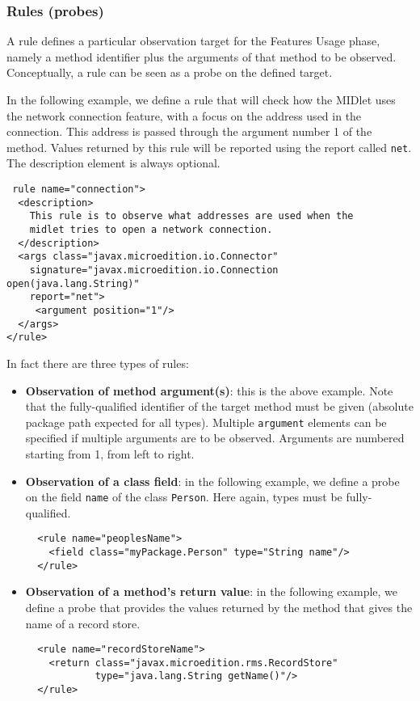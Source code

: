 \subsubsection{Rules (probes)}
A rule defines a particular observation target for the Features Usage
phase, namely a method identifier plus the arguments of that method to
be observed. Conceptually, a rule can be seen as a probe on the
defined target.

In the following example, we define a rule that will check how the
MIDlet uses the network connection feature, with a focus on the
address used in the connection. This address is passed through the
argument number 1 of the method. Values returned by this rule will be
reported using the report called \texttt{net}. The description element
is always optional.
\begin{verbatim}
 rule name="connection">
  <description>
    This rule is to observe what addresses are used when the
    midlet tries to open a network connection.
  </description>
  <args class="javax.microedition.io.Connector"
    signature="javax.microedition.io.Connection open(java.lang.String)"
    report="net">
     <argument position="1"/>
  </args>
</rule>
\end{verbatim}

In fact there are three types of rules:
\begin{itemize}
\item{\textbf{Observation of method argument(s)}}: this is the above
  example. Note that the fully-qualified identifier of the target
  method must be given (absolute package path expected for all types).
  Multiple \texttt{argument} elements can be specified if
  multiple arguments are to be observed. Arguments are numbered
  starting from 1, from left to right. 
\item{\textbf{Observation of a class field}}: in the following
  example, we define a probe on the field \texttt{name} of the class
  \texttt{Person}. Here again, types must be fully-qualified.
\begin{verbatim}
  <rule name="peoplesName">
    <field class="myPackage.Person" type="String name"/>   
  </rule>
\end{verbatim}
\item{\textbf{Observation of a method's return value}}: in the
  following example, we define a probe that provides the values
  returned by the method that gives the name of a record
  store.
\begin{verbatim}
  <rule name="recordStoreName">
    <return class="javax.microedition.rms.RecordStore" 
            type="java.lang.String getName()"/>   
  </rule>
\end{verbatim}
\end{itemize}


